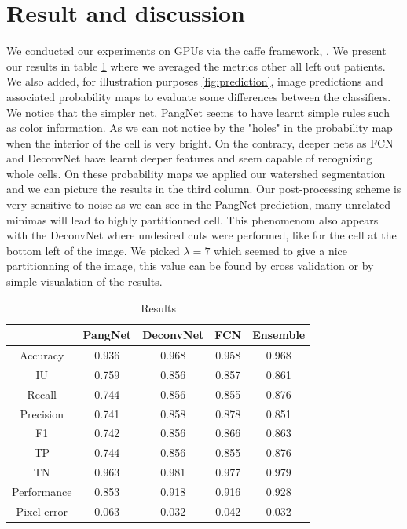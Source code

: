 \documentclass{article}
\begin{document}
\section{Result and discussion}
\label{sec:result}
\noindent We conducted our experiments on GPUs via the caffe framework, 
\cite{jia2014caffe}. We present our results in table \ref{tab:res} where 
we averaged the metrics other all left out patients. We also added, for 
illustration purposes \ref{fig:prediction}, image predictions and 
associated 
probability maps to evaluate some differences between the classifiers. 
We notice that the simpler net, PangNet seems to have learnt simple 
rules such as color information. As we can not notice by the "holes" in 
the probability map when the interior of the cell is very bright. On the 
contrary, deeper nets as FCN and DeconvNet have learnt deeper features 
and seem capable of recognizing whole cells. On these probability maps 
we applied our watershed segmentation and we can picture the results in 
the third 
column. Our post-processing 
scheme is very sensitive to noise as we can see in the PangNet 
prediction, many unrelated minimas will lead to highly partitionned cell. 
This phenomenom also appears with the DeconvNet where undesired 
cuts were performed, like for the cell at the bottom left of the image. 
We picked $\lambda = 7$ which seemed to give a nice partitionning of 
the image, this value can be found by cross validation or by simple 
visualation of the results.
\begin{table}
\begin{tabular}{|c|c|c|c|c|}
\hline
  & PangNet & DeconvNet & FCN & Ensemble\\
 \hline
Accuracy  &       0.936 & 0.968 &0.958 & 0.968  \\
IU   &    0.759 &     0.856 & 0.857 & 0.861 \\
Recall     &       0.744  &     0.856 & 0.855 & 0.876\\
Precision   &       0.741 &     0.858 & 0.878 & 0.851\\
F1    &       0.742 &     0.856 & 0.866  & 0.863\\
TP       &       0.744 &     0.856 & 0.855 & 0.876 \\
TN      &       0.963 &     0.981 &  0.977 & 0.979\\
Performance    &       0.853 &     0.918 & 0.916 & 0.928\\
Pixel error  &  0.063 &     0.032 & 0.042 & 0.032\\
\hline
\end{tabular}
\caption{Results}
\label{tab:res}
\end{table}
\end{document}
